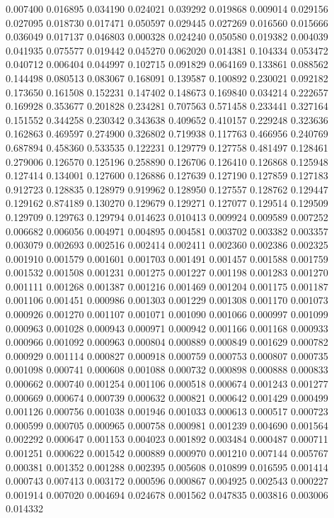 0.007400
0.016895
0.034190
0.024021
0.039292
0.019868
0.009014
0.029156
0.027095
0.018730
0.017471
0.050597
0.029445
0.027269
0.016560
0.015666
0.036049
0.017137
0.046803
0.000328
0.024240
0.050580
0.019382
0.004039
0.041935
0.075577
0.019442
0.045270
0.062020
0.014381
0.104334
0.053472
0.040712
0.006404
0.044997
0.102715
0.091829
0.064169
0.133861
0.088562
0.144498
0.080513
0.083067
0.168091
0.139587
0.100892
0.230021
0.092182
0.173650
0.161508
0.152231
0.147402
0.148673
0.169840
0.034214
0.222657
0.169928
0.353677
0.201828
0.234281
0.707563
0.571458
0.233441
0.327164
0.151552
0.344258
0.230342
0.343638
0.409652
0.410157
0.229248
0.323636
0.162863
0.469597
0.274900
0.326802
0.719938
0.117763
0.466956
0.240769
0.687894
0.458360
0.533535
0.122231
0.129779
0.127758
0.481497
0.128461
0.279006
0.126570
0.125196
0.258890
0.126706
0.126410
0.126868
0.125948
0.127414
0.134001
0.127600
0.126886
0.127639
0.127190
0.127859
0.127183
0.912723
0.128835
0.128979
0.919962
0.128950
0.127557
0.128762
0.129447
0.129162
0.874189
0.130270
0.129679
0.129271
0.127077
0.129514
0.129509
0.129709
0.129763
0.129794
0.014623
0.010413
0.009924
0.009589
0.007252
0.006682
0.006056
0.004971
0.004895
0.004581
0.003702
0.003382
0.003357
0.003079
0.002693
0.002516
0.002414
0.002411
0.002360
0.002386
0.002325
0.001910
0.001579
0.001601
0.001703
0.001491
0.001457
0.001588
0.001759
0.001532
0.001508
0.001231
0.001275
0.001227
0.001198
0.001283
0.001270
0.001111
0.001268
0.001387
0.001216
0.001469
0.001204
0.001175
0.001187
0.001106
0.001451
0.000986
0.001303
0.001229
0.001308
0.001170
0.001073
0.000926
0.001270
0.001107
0.001071
0.001090
0.001066
0.000997
0.001099
0.000963
0.001028
0.000943
0.000971
0.000942
0.001166
0.001168
0.000933
0.000966
0.001092
0.000963
0.000804
0.000889
0.000849
0.001629
0.000782
0.000929
0.001114
0.000827
0.000918
0.000759
0.000753
0.000807
0.000735
0.001098
0.000741
0.000608
0.001088
0.000732
0.000898
0.000888
0.000833
0.000662
0.000740
0.001254
0.001106
0.000518
0.000674
0.001243
0.001277
0.000669
0.000674
0.000739
0.000632
0.000821
0.000642
0.001429
0.000499
0.001126
0.000756
0.001038
0.001946
0.001033
0.000613
0.000517
0.000723
0.000599
0.000705
0.000965
0.000758
0.000981
0.001239
0.004690
0.001564
0.002292
0.000647
0.001153
0.004023
0.001892
0.003484
0.000487
0.000711
0.001251
0.000622
0.001542
0.000889
0.000970
0.001210
0.007144
0.005767
0.000381
0.001352
0.001288
0.002395
0.005608
0.010899
0.016595
0.001414
0.000743
0.007413
0.003172
0.000596
0.000867
0.004925
0.002543
0.000227
0.001914
0.007020
0.004694
0.024678
0.001562
0.047835
0.003816
0.003006
0.014332
